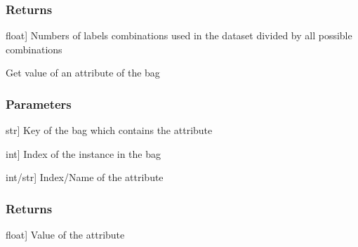\documentclass[letterpaper,10pt,english]{sphinxmanual}
\begin{document}
\begin{fulllineitems}
\begin{fulllineitems}
\subsubsection{Returns}
\label{\detokenize{data/_autosummary/miml.data.miml_dataset.MIMLDataset:id7}}\begin{description}
\sphinxlineitem{distinct}{[}float{]}
\sphinxAtStartPar
Numbers of labels combinations used in the dataset divided by all possible combinations

\end{description}

\end{fulllineitems}


\begin{fulllineitems}
\label{\detokenize{data/_autosummary/miml.data.miml_dataset.MIMLDataset:miml.data.miml_dataset.MIMLDataset.get_attribute}}
\pysigstartsignatures
{}
\pysigstopsignatures
\sphinxAtStartPar
Get value of an attribute of the bag


\subsubsection{Parameters}
\label{\detokenize{data/_autosummary/miml.data.miml_dataset.MIMLDataset:id8}}\begin{description}
\sphinxlineitem{bag}{[}str{]}
\sphinxAtStartPar
Key of the bag which contains the attribute

\sphinxlineitem{instance}{[}int{]}
\sphinxAtStartPar
Index of the instance in the bag

\sphinxlineitem{attribute}{[}int/str{]}
\sphinxAtStartPar
Index/Name of the attribute

\end{description}


\subsubsection{Returns}
\label{\detokenize{data/_autosummary/miml.data.miml_dataset.MIMLDataset:id9}}\begin{description}
\sphinxlineitem{value}{[}float{]}
\sphinxAtStartPar
Value of the attribute


\end{description}
\end{fulllineitems}
\end{fulllineitems}
\end{document}
